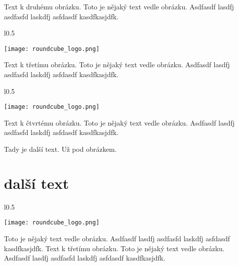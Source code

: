 \documentclass[12pt,a4paper,twoside]{book}
\begin{document}
Text k druhému obrázku. Toto je nějaký text vedle obrázku. Asdfasdf lasdfj asdfasfd laskdfj asfdasdf kasdfkasjdfk.
\newline

\begin{wrapfigure}{l}{0.5\textwidth}
  \vspace{-20pt}
  \begin{center}
    \texttt{[image: roundcube\_logo.png]}
  \end{center}
  \vspace{-20pt}
\end{wrapfigure}

Text k třetímu obrázku. Toto je nějaký text vedle obrázku. Asdfasdf lasdfj asdfasfd laskdfj asfdasdf kasdfkasjdfk.
\newline

\begin{wrapfigure}{l}{0.5\textwidth}
  \vspace{-20pt}
  \begin{center}
    \texttt{[image: roundcube\_logo.png]}
  \end{center}
  \vspace{-20pt}
\end{wrapfigure}

Text k čtvrtému obrázku. Toto je nějaký text vedle obrázku. Asdfasdf lasdfj asdfasfd laskdfj asfdasdf kasdfkasjdfk.
\newline


Tady je další text. Už pod obrázkem.

\section{další  text}

\begin{wrapfigure}{l}{0.5\textwidth}
  \vspace{-30pt}
  \begin{center}
    \texttt{[image: roundcube\_logo.png]}
  \end{center}
  \vspace{-10pt}
\end{wrapfigure}

Toto je nějaký text vedle obrázku. Asdfasdf lasdfj asdfasfd laskdfj asfdasdf kasdfkasjdfk.
\newline
Text k třetímu obrázku. Toto je nějaký text vedle obrázku. Asdfasdf lasdfj asdfasfd laskdfj asfdasdf kasdfkasjdfk.
\newline
\end{document}
